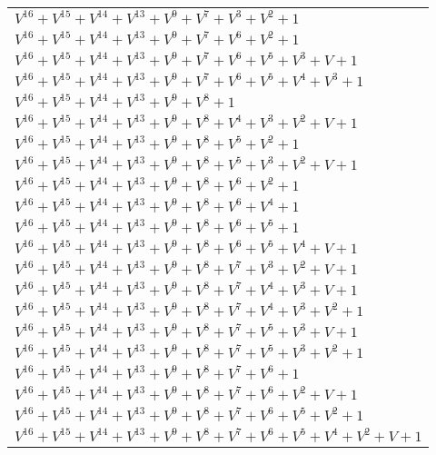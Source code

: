 \documentclass[12pt]{article}
\begin{document}
\begin{adjustwidth}{-4cm}{}
\begin{center}
\begin{longtable}{|l|}
$V^{16}  +V^{15}  +V^{14}  +V^{13}  +V^{9}  +V^{7}  +V^{3}  +V^{2}  + 1$ \\
$V^{16}  +V^{15}  +V^{14}  +V^{13}  +V^{9}  +V^{7}  +V^{6}  +V^{2}  + 1$ \\
$V^{16}  +V^{15}  +V^{14}  +V^{13}  +V^{9}  +V^{7}  +V^{6}  +V^{5}  +V^{3}  + V + 1$ \\
$V^{16}  +V^{15}  +V^{14}  +V^{13}  +V^{9}  +V^{7}  +V^{6}  +V^{5}  +V^{4}  +V^{3}  + 1$ \\
$V^{16}  +V^{15}  +V^{14}  +V^{13}  +V^{9}  +V^{8}  + 1$ \\
$V^{16}  +V^{15}  +V^{14}  +V^{13}  +V^{9}  +V^{8}  +V^{4}  +V^{3}  +V^{2}  + V + 1$ \\
$V^{16}  +V^{15}  +V^{14}  +V^{13}  +V^{9}  +V^{8}  +V^{5}  +V^{2}  + 1$ \\
$V^{16}  +V^{15}  +V^{14}  +V^{13}  +V^{9}  +V^{8}  +V^{5}  +V^{3}  +V^{2}  + V + 1$ \\
$V^{16}  +V^{15}  +V^{14}  +V^{13}  +V^{9}  +V^{8}  +V^{6}  +V^{2}  + 1$ \\
$V^{16}  +V^{15}  +V^{14}  +V^{13}  +V^{9}  +V^{8}  +V^{6}  +V^{4}  + 1$ \\
$V^{16}  +V^{15}  +V^{14}  +V^{13}  +V^{9}  +V^{8}  +V^{6}  +V^{5}  + 1$ \\
$V^{16}  +V^{15}  +V^{14}  +V^{13}  +V^{9}  +V^{8}  +V^{6}  +V^{5}  +V^{4}  + V + 1$ \\
$V^{16}  +V^{15}  +V^{14}  +V^{13}  +V^{9}  +V^{8}  +V^{7}  +V^{3}  +V^{2}  + V + 1$ \\
$V^{16}  +V^{15}  +V^{14}  +V^{13}  +V^{9}  +V^{8}  +V^{7}  +V^{4}  +V^{3}  + V + 1$ \\
$V^{16}  +V^{15}  +V^{14}  +V^{13}  +V^{9}  +V^{8}  +V^{7}  +V^{4}  +V^{3}  +V^{2}  + 1$ \\
$V^{16}  +V^{15}  +V^{14}  +V^{13}  +V^{9}  +V^{8}  +V^{7}  +V^{5}  +V^{3}  + V + 1$ \\
$V^{16}  +V^{15}  +V^{14}  +V^{13}  +V^{9}  +V^{8}  +V^{7}  +V^{5}  +V^{3}  +V^{2}  + 1$ \\
$V^{16}  +V^{15}  +V^{14}  +V^{13}  +V^{9}  +V^{8}  +V^{7}  +V^{6}  + 1$ \\
$V^{16}  +V^{15}  +V^{14}  +V^{13}  +V^{9}  +V^{8}  +V^{7}  +V^{6}  +V^{2}  + V + 1$ \\
$V^{16}  +V^{15}  +V^{14}  +V^{13}  +V^{9}  +V^{8}  +V^{7}  +V^{6}  +V^{5}  +V^{2}  + 1$ \\
$V^{16}  +V^{15}  +V^{14}  +V^{13}  +V^{9}  +V^{8}  +V^{7}  +V^{6}  +V^{5}  +V^{4}  +V^{2}  + V + 1$ \\

\end{longtable}
\end{center}
\end{adjustwidth}
\end{document}

